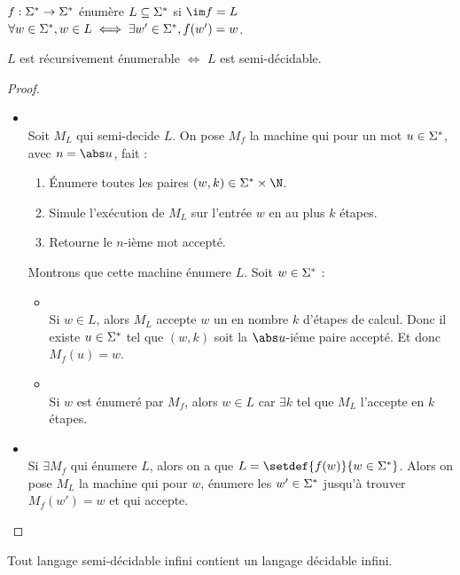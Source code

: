 \begin{definition}
	$f : \Sigma^{*} \to \Sigma^{*}$ énumère $L \subseteq \Sigma^{*}$ si $\im f = L$ \ie $\forall w \in \Sigma^{*}, w \in L \iff \exists w' \in \Sigma^{*}, f (w') = w$.
\end{definition}

\begin{prop}
	$L$ est récursivement énumerable $\iff$ $L$ est semi-décidable.
\end{prop}

\begin{proof}
	\begin{itemize}
		\item \bimpLR \\
		      Soit $M_L$ qui semi-decide $L$. On pose $M_f$ la machine qui pour un mot $u \in \Sigma^{*}$, avec $n = \abs u$, fait :
		      \begin{enumerate}
			      \item Énumere toutes les paires $(w,k) \in \mots \times \N$.
			      \item Simule l'exécution de $M_L$ sur l'entrée $w$ en au plus $k$ étapes.
			      \item Retourne le $n$-ième mot accepté.
		      \end{enumerate}

		      Montrons que cette machine énumere $L$. Soit $w \in \Sigma^{*}$ :
		      \begin{itemize}
			      \item \bimpLR \\
			            Si $w \in L$, alors $M_L$ accepte $w$ un en nombre $k$ d'étapes de calcul. Donc il existe $u \in \Sigma^{*}$ tel que
			            $(w,k)$ soit la $\abs u$-iéme paire accepté. Et donc $M_f(u) = w$.
			      \item \bimpRL \\
			            Si $w$ est énumeré par $M_f$, alors $w \in L$ car $\exists k$ tel que $M_L$ l'accepte en $k$ étapes.
		      \end{itemize}

		\item \bimpRL \\
		      Si $\exists M_f$ qui énumere $L$, alors on a que $L = \setdef {f(w)} {w \in \mots}$. Alors on pose $M_L$ la machine qui pour $w$,
		      énumere les $w' \in \Sigma^{*}$ jusqu'à trouver $M_f(w') = w$ et qui accepte.
	\end{itemize}
\end{proof}


\begin{prop}
	Tout langage semi-décidable infini contient un langage décidable infini.
\end{prop}

